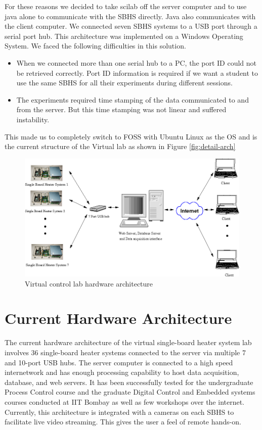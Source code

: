 For these reasons  we decided to take scilab off the server computer
and to use java alone to communicate with the SBHS directly.  Java
also 
communicates with the client computer.  We connected seven SBHS
systems to a USB port through a serial port hub.  This architecture
was 
implemented on a Windows Operating System.  We faced the following
difficulties in this solution.
\begin{itemize}
\item When we connected more than one serial hub to a PC, the port ID
  could not be retrieved correctly.  Port ID information is required
  if we want a student to use the same SBHS for all their experiments
  during different sessions.
\item The experiments required time stamping of the data communicated
  to and from the server. But this time stamping was not linear and
  suffered instability.  
\end{itemize}
This made us to completely switch to FOSS with Ubuntu Linux as the OS
and is the current structure of the Virtual lab as shown in Figure
\ref{fig:detail-arch} 

\begin{figure}
\centering
\includegraphics[width=\linewidth]{vlabs/vlab-arch}
\caption{Virtual control lab hardware architecture}
\label{fig:hw-arch}
\end{figure}

\section{Current Hardware Architecture}
The current hardware architecture of the virtual single-board heater system lab involves 36 single-board heater systems connected to the server via multiple 7 and 10-port USB hubs. The server computer is connected to a high speed internetwork and has enough processing capability to host data acquisition, database, and web servers. 
It has been successfully tested for the undergraduate Process Control course and the graduate Digital Control and Embedded systems courses conducted at IIT Bombay as well as few workshops over the internet. Currently, this architecture is integrated with a cameras on each SBHS to facilitate live video streaming. This gives the user a feel of remote hands-on. 

